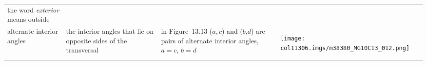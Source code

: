 \begin{table}[H]
\begin{center}
\begin{xtabular*}{\mytablewidth}[t]{|p{3cm}|p{3cm}|p{3cm}|p{20\mystarwidth}|}
    
        the word \textsl{exterior} means outside%
     \tabularnewline{}
    
    
        alternate interior angles &
    
    
        the interior angles that lie on opposite sides of the transversal &
    
    
        in Figure~13.13 (\begin{math}a,c\end{math}) and (\begin{math}b\end{math},\begin{math}d\end{math}) are pairs of alternate interior angles, \begin{math}a=c\end{math}, \begin{math}b=d\end{math} &
    
    
        
                  
    \setcounter{subfigure}{0}

\label{m38380*id316794}
    \begin{center}
    \label{m38380*id316794!!!underscore!!!media}\label{m38380*id316794!!!underscore!!!printimage}\texttt{[image: col11306.imgs/m38380\_MG10C13\_012.png]} %
        

\end{center}
\end{xtabular*}
\end{center}
\end{table}
